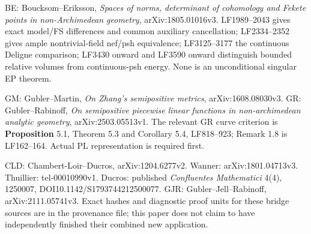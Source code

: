\documentclass[
  10pt,
]{article}
\begin{document}
BE: Boucksom--Eriksson, \emph{Spaces of norms, determinant of cohomology
and Fekete points in non-Archimedean geometry}, arXiv:1805.01016v3.
LF1989--2043 gives exact model/FS differences and common auxiliary
cancellation; LF2334--2352 gives ample nontrivial-field nef/psh
equivalence; LF3125--3177 the continuous Deligne comparison; LF3430
onward and LF3590 onward distinguish bounded relative volumes from
continuous-psh energy. None is an unconditional singular EP theorem.

GM: Gubler--Martin, \emph{On Zhang's semipositive metrics},
arXiv:1608.08030v3. GR: Gubler--Rabinoff, \emph{On semipositive
piecewise linear functions in non-archimedean analytic geometry},
arXiv:2503.05513v1. The relevant GR curve criterion is
\textbf{Proposition} 5.1, Theorem 5.3 and Corollary 5.4, LF818--923;
Remark 1.8 is LF162--164. Actual PL representation is required first.

CLD: Chambert-Loir--Ducros, arXiv:1204.6277v2. Wanner:
arXiv:1801.04713v3. Thuillier: tel-00010990v1. Ducros: published
\emph{Confluentes Mathematici} 4(4), 1250007,
DOI10.1142/S1793744212500077. GJR: Gubler--Jell--Rabinoff,
arXiv:2111.05741v3. Exact hashes and diagnostic proof units for these
bridge sources are in the provenance file; this paper does not claim to
have independently finished their combined new application.
\end{document}
